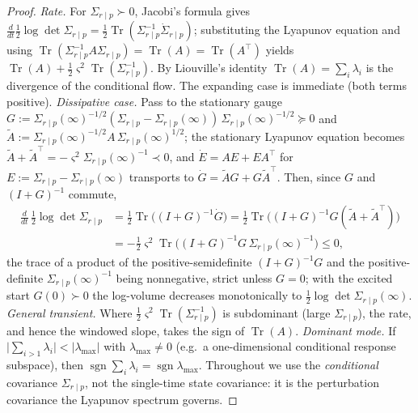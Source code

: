 \documentclass[11pt]{article}
\theoremstyle{plain}
\theoremstyle{definition}
\theoremstyle{remark}
\newcommand{\Sst}{\Sigma_{r\mid p}(\infty)}
\begin{document}
\begin{proof}
\emph{Rate.} For $\Sigma_{r\mid p}\succ0$, Jacobi's formula gives $\tfrac{d}{dt}\tfrac12\log\det\Sigma_{r\mid p}=\tfrac12\operatorname{Tr}(\Sigma_{r\mid p}^{-1}\dot\Sigma_{r\mid p})$; substituting the Lyapunov equation and using $\operatorname{Tr}(\Sigma_{r\mid p}^{-1}A\Sigma_{r\mid p})=\operatorname{Tr}(A)=\operatorname{Tr}(A^{\top})$ yields $\operatorname{Tr}(A)+\tfrac12\varsigma^2\operatorname{Tr}(\Sigma_{r\mid p}^{-1})$. By Liouville's identity $\operatorname{Tr}(A)=\sum_i\lambda_i$ is the divergence of the conditional flow. The expanding case is immediate (both terms positive). \emph{Dissipative case.} Pass to the stationary gauge $G:=\Sst^{-1/2}(\Sigma_{r\mid p}-\Sst)\,\Sst^{-1/2}\succeq0$ and $\tilde A:=\Sst^{-1/2}A\,\Sst^{1/2}$; the stationary Lyapunov equation becomes $\tilde A+\tilde A^{\top}=-\varsigma^2\Sst^{-1}\prec0$, and $\dot E=AE+EA^{\top}$ for $E:=\Sigma_{r\mid p}-\Sst$ transports to $\dot G=\tilde A G+G\tilde A^{\top}$. Then, since $G$ and $(I+G)^{-1}$ commute,
\begin{align*}
\frac{d}{dt}\,\tfrac12\log\det\Sigma_{r\mid p}&=\tfrac12\operatorname{Tr}\!\big((I+G)^{-1}\dot G\big)=\tfrac12\operatorname{Tr}\!\big((I+G)^{-1}G(\tilde A+\tilde A^{\top})\big)\\
&=-\tfrac12\varsigma^2\operatorname{Tr}\!\big((I+G)^{-1}G\,\Sst^{-1}\big)\le0,
\end{align*}
the trace of a product of the positive-semidefinite $(I+G)^{-1}G$ and the positive-definite $\Sst^{-1}$ being nonnegative, strict unless $G=0$; with the excited start $G(0)\succ0$ the log-volume decreases monotonically to $\tfrac12\log\det\Sst$. \emph{General transient.} Where $\tfrac12\varsigma^2\operatorname{Tr}(\Sigma_{r\mid p}^{-1})$ is subdominant (large $\Sigma_{r\mid p}$), the rate, and hence the windowed slope, takes the sign of $\operatorname{Tr}(A)$. \emph{Dominant mode.} If $\big|\sum_{i>1}\lambda_i\big|<|\lambda_{\max}|$ with $\lambda_{\max}\neq0$ (e.g.\ a one-dimensional conditional response subspace), then $\operatorname{sgn}\sum_i\lambda_i=\operatorname{sgn}\lambda_{\max}$. Throughout we use the \emph{conditional} covariance $\Sigma_{r\mid p}$, not the single-time state covariance: it is the perturbation covariance the Lyapunov spectrum governs.
\end{proof}
\end{document}
